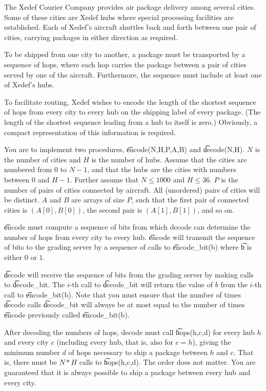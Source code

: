 The Xedef Courier Company provides air package delivery among several cities. Some of these cities are Xedef hubs where special processing facilities are established. Each of Xedef's aircraft shuttles back and forth between one pair of cities, carrying packages in either direction as required.  

To be shipped from one city to another, a package must be transported by a sequence of hops, where each hop carries the package between a pair of cities served by one of the
aircraft. Furthermore, the sequence must include at least one of Xedef's hubs.

To facilitate routing, Xedef wishes to encode the length of the shortest sequence of
hops from every city to every hub on the shipping label of every package. (The length
of the shortest sequence leading from a hub to itself is zero.) Obviously, a compact
representation of this information is required. 

You are to implement two procedures, \t{encode(N,H,P,A,B)} and \t{decode(N,H)}. $N$ is the number of cities and $H$ is the number of hubs. Assume that the cities are numbered
from $0$ to $N-1$, and that the hubs are the cities with numbers between $0$ and $H-1$.
Further assume that $N \le 1000$ and $H \le 36$. $P$ is the number of pairs of cities connected by aircraft. All (unordered) pairs of cities will be distinct. $A$ and $B$ are arrays of size $P$, such that the first pair of connected cities is $(A[0], B[0])$, the second pair is $(A[1], B[1])$, and so on.

\t{encode} must compute a sequence of bits from which decode can determine the
number of hops from every city to every hub. \t{encode} will transmit the sequence of
bits to the grading server by a sequence of calls to \t{encode\_bit(b)} where \t{b} is either $0$ or $1$. 

\t{decode} will receive the sequence of bits from the grading server by making calls
to \t{decode\_bit}. The $i$-th call to \t{decode\_bit} will return the value of $b$ from the $i$-th call to \t{encode\_bit(b)}. Note that you must ensure that the number of
times \t{decode} calls \t{decode\_bit} will always be at most equal to the number of
times \t{encode} previously called \t{encode\_bit(b)}.

After decoding the numbers of hops, decode must call \t{hops(h,c,d)} for every
hub $h$ and every city $c$ (including every hub, that is, also for $c=h$), giving the
minimum number $d$ of hops necessary to ship a package between $h$ and $c$. That is,
there must be $N*H$ calls to \t{hops(h,c,d)}. The order does not matter. You are 
guaranteed that it is always possible to ship a package between every hub and every
city.

